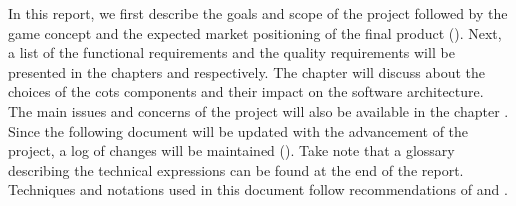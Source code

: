 In this report, we first describe the goals and scope of the project followed by the game concept and the expected market positioning of the final product (). Next, a list of the functional requirements and the quality requirements will be presented in the chapters  and  respectively. The chapter  will discuss about the choices of the \gls{cots} components and their impact on the software architecture. The main issues and concerns of the project will also be available in the chapter . Since the following document will be updated with the advancement of the project, a log of changes will be maintained (). Take note that a glossary describing the technical expressions can be found at the end of the report.  \\

Techniques and notations used in this document follow recommendations of \cite{bass2013} and \cite{larman2005}.
